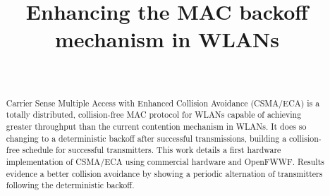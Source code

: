 \documentclass[a4paper,journal]{IEEEtran}
\begin{document}
 \title{Enhancing the MAC backoff mechanism in WLANs}


  \author{
      \\
  }




\maketitle

\begin{abstract}
Carrier Sense Multiple Access with Enhanced Collision Avoidance (CSMA/ECA) is a totally distributed, collision-free MAC protocol for WLANs capable of achieving greater throughput than the current contention mechanism in WLANs. It does so changing to a deterministic backoff after successful transmissions, building a collision-free schedule for successful transmitters. This work details a first hardware implementation of CSMA/ECA using commercial hardware and OpenFWWF. Results evidence a better collision avoidance by showing a periodic alternation of transmitters following the deterministic backoff.

\end{abstract}
\end{document}
